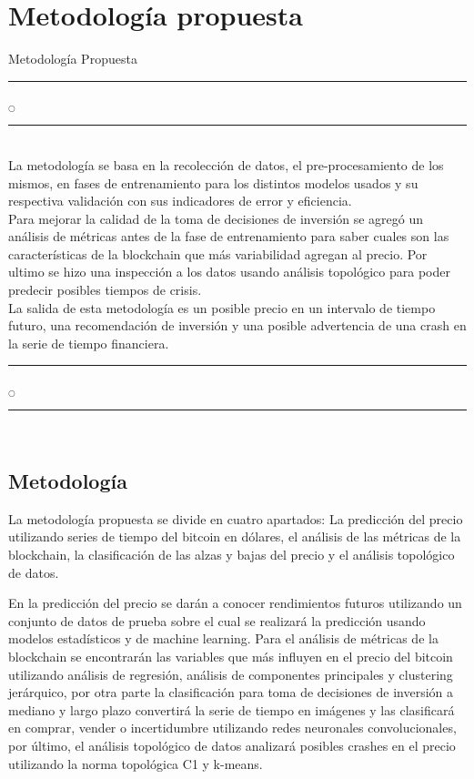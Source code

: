 \chapter[Metodología]{Metodología propuesta}{Metodología Propuesta}\label{Metodologia}

\noindent
\rule{0.49\textwidth}{0.75pt} $_{\bigcirc}$ \rule{0.49\textwidth}{0.75pt}\\

La metodología se basa en la recolección de datos, el pre-procesamiento de los mismos, en fases de entrenamiento para los distintos modelos usados y su respectiva validación con sus indicadores de error y eficiencia.\\
Para mejorar la calidad de la toma de decisiones de inversión se agregó un análisis de métricas antes de la fase de entrenamiento para saber cuales son las características de la blockchain que más variabilidad agregan al precio. Por ultimo se hizo una inspección a los datos usando análisis topológico para poder predecir posibles tiempos de crisis.\\
La salida de esta metodología es un posible precio en un intervalo de tiempo futuro, una recomendación de inversión y una posible advertencia de una crash en la serie de tiempo financiera.\\

\noindent
\rule{0.49\textwidth}{0.75pt} $_{\bigcirc}$ \rule{0.49\textwidth}{0.75pt}\\
\clearpage

\section{Metodología}

La metodología propuesta se divide en cuatro apartados: La predicción del precio utilizando series de tiempo del bitcoin en dólares, el análisis de las métricas de la blockchain, la clasificación de las alzas y bajas del precio y el análisis topológico de datos.
 
En la predicción del precio se darán a conocer rendimientos futuros utilizando un conjunto de datos de prueba sobre el cual se realizará la predicción usando modelos estadísticos y de machine learning. Para el análisis de métricas de la blockchain se encontrarán las variables que más influyen en el precio del bitcoin utilizando análisis de regresión, análisis de componentes principales y clustering jerárquico, por otra parte la clasificación para toma de decisiones de inversión a mediano y largo plazo convertirá la serie de tiempo en imágenes y las clasificará en comprar, vender o incertidumbre utilizando redes neuronales convolucionales, por último, el análisis topológico de datos analizará posibles crashes en el precio utilizando la norma topológica C1 y k-means.

